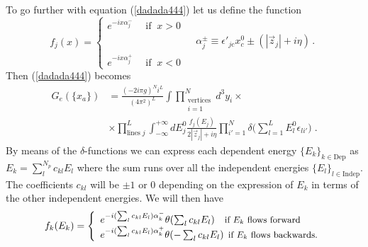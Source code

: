 \documentclass[%
 reprint,
 amsmath,amssymb,
 aps,
]{revtex4-1}
\begin{document}
To go further with equation (\ref{dadada444}) let us define the function
 \[
    f_j(x)=\left\{
                \begin{array}{ll}
                  e^{-ix\alpha^-_j}\:\:\;\;\;\text{if}\;\;x>0\\
                  \;\:\:\;\;\;\:\:\;\;\;\:\:\;\;\;\:\:\;\;\;\:\;\;\:\;\;\;\:\:\:\:\;\;\;\alpha^\pm_j\equiv \epsilon'_{jc}x^0_c\pm(|\vec{z}_j|+i\eta) \,.\\
                  e^{-ix\alpha^+_j}\:\:\;\;\;\text{if}\;\;x<0
                 \end{array}
              \right.
  \]
  Then (\ref{dadada444}) becomes
  \begin{align}
G_e(\{x_a\})&=\frac{(-2i\pi g)^Ni^L}{(4\pi^2)^L}\int\prod_{\substack{\text{vertices}\\i=1}}^Nd^3y_i\nonumber\times\\
&\times\prod_{\text{lines}\;j}^L\int_{-\infty}^{+\infty}{dE^0_j}\frac{f_j(E_j)}{2|{\vec{z}_j}|+i\eta}\prod_{i'=1}^N\delta\Big(\sum_{l=1}^LE_{l}^0\epsilon_{li'}\Big)\;.\label{dadada4424}
\end{align}
By means of the $\delta$-functions we can express each dependent energy $\{E_k\}_{k\in\text{Dep}}$ as $E_k=\sum_l^{N_p} c_{kl}E_l$ where the sum runs over all the independent energies $\{E_l\}_{l\in\text{Indep}}$. The coefficients $c_{kl}$ will be $\pm1$ or 0 depending on the expression of $E_k$ in terms of the other independent energies. We will then have
 \[
    f_k(E_k)=\left\{
                \begin{array}{ll}
                  e^{-i(\sum_l c_{kl}E_l)\alpha^-_k}\theta(\sum_l c_{kl}E_l)\:\:\;\;\small{\text{if $E_k$ flows forward}}\\
                  e^{-i(\sum_l c_{kl}E_l)\alpha^+_k}\theta(-\sum_l c_{kl}E_l)\:\:\small{\text{if $E_k$ flows backwards.}}
                 \end{array}
              \right.
  \]
  
\end{document}
